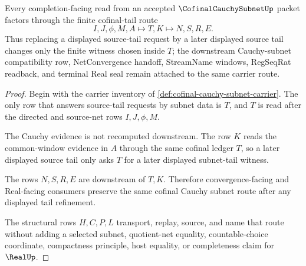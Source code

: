 \begin{theorem}
\label{thm:cofinal-cauchy-subnet-cofinal-tail-stability}
Every completion-facing read from an accepted $\CofinalCauchySubnetUp$ packet factors through the finite cofinal-tail route
$$
I,J,\phi,M,A \longmapsto T,K \longmapsto N,S,R,E .
$$
Thus replacing a displayed source-tail request by a later displayed source tail changes only the finite witness chosen inside $T$; the downstream Cauchy-subnet compatibility row, NetConvergence handoff, StreamName windows, RegSeqRat readback, and terminal Real seal remain attached to the same carrier route.
\end{theorem}
\begin{proof}
Begin with the carrier inventory of \autoref{def:cofinal-cauchy-subnet-carrier}. The only row that answers source-tail requests by subnet data is $T$, and $T$ is read after the directed and source-net rows $I,J,\phi,M$.

The Cauchy evidence is not recomputed downstream. The row $K$ reads the common-window evidence in $A$ through the same cofinal ledger $T$, so a later displayed source tail only asks $T$ for a later displayed subnet-tail witness.

The rows $N,S,R,E$ are downstream of $T,K$. Therefore convergence-facing and Real-facing consumers preserve the same cofinal Cauchy subnet route after any displayed tail refinement.

The structural rows $H,C,P,L$ transport, replay, source, and name that route without adding a selected subnet, quotient-net equality, countable-choice coordinate, compactness principle, host equality, or completeness claim for $\RealUp$.
\end{proof}



